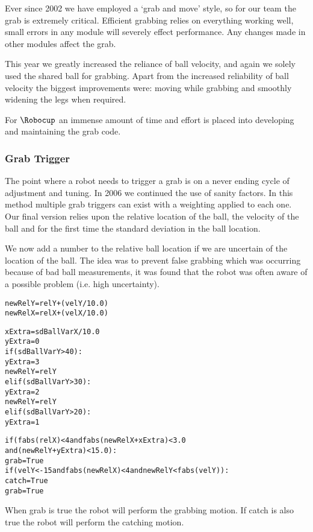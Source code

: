 Ever since 2002 we have employed a `grab and move' style, so for our
team the grab is extremely critical. Efficient grabbing relies on
everything working well, small errors in any module will severely
effect performance. Any changes made in other modules affect the
grab.

This year we greatly increased the reliance of ball velocity, and again we solely used the shared ball for grabbing. Apart from the increased reliability of ball velocity the biggest improvements were: moving while grabbing and smoothly widening the legs when required.

For $\Robocup$ an immense amount of time and effort is placed into
developing and maintaining the grab code.

\subsubsection{Grab Trigger}

The point where a robot needs to trigger a grab is on a never ending
cycle of adjustment and tuning. In 2006 we continued the use of sanity factors. In
this method multiple grab triggers can exist with a weighting
applied to each one. Our final version relies upon the relative
location of the ball, the velocity of the ball and for the first time the standard deviation in the ball location.

We now add a number to the relative ball location if we are uncertain of the location of the ball. The idea was to prevent false grabbing which was occurring because of bad ball measurements, it was found that the robot was often aware of a possible problem (i.e. high uncertainty).

\begin{alltt}
  newRelY = relY + (velY/10.0)
  newRelX = relX + (velX/10.0)
  
  xExtra = sdBallVarX/10.0
  yExtra = 0
  if (sdBallVarY > 40):
    yExtra = 3
    newRelY = relY
  elif (sdBallVarY > 30):
    yExtra = 2
    newRelY = relY
  elif (sdBallVarY > 20):
    yExtra = 1
    
  if (fabs(relX) < 4 and fabs(newRelX+xExtra) < 3.0 \\ and (newRelY+yExtra) < 15.0): 
  	grab = True
  if (velY < -15 and fabs(newRelX) < 4 and newRelY < fabs(velY)): 
  	catch = True
    grab = True
\end{alltt}

When grab is true the robot will perform the grabbing motion. If catch is also true the robot will perform the catching motion.

